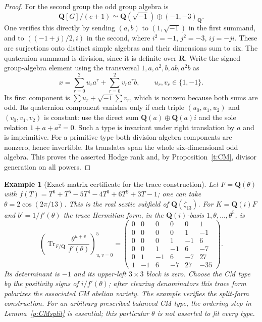 \documentclass[11pt,reqno]{article}
\theoremstyle{emphasizedplain}
\theoremstyle{emphasizeddefinition}
\newtheorem{example}[theorem]{Example}
\theoremstyle{emphasizeddefinition}
\DeclareMathOperator{\Tr}{Tr}
\newcommand{\Q}{\mathbf Q}
\newcommand{\R}{\mathbf R}
\begin{document}
\begin{proof}
For the second group the odd group algebra is
\[
 \Q[G]/(c+1)\simeq\Q(\sqrt{-1})\oplus(-1,-3)_\Q.
\]
One verifies this directly by sending $(a,b)$ to $(1,\sqrt{-1})$
in the first summand, and to $((-1+j)/2,i)$ in the second, where
$i^2=-1$, $j^2=-3$, $ij=-ji$. These are surjections onto distinct
simple algebras and their dimensions sum to six. The quaternion
summand is division, since it is definite over $\R$.
Write the signed group-algebra element using the transversal
$1,a,a^2,b,ab,a^2b$ as
\[
 x=\sum_{r=0}^2u_ra^r+\sum_{r=0}^2v_ra^rb,
 \qquad u_r,v_r\in\{1,-1\}.
\]
Its first component is $\sum u_r+\sqrt{-1}\sum v_r$, which is
nonzero because both sums are odd. Its quaternion component vanishes
only if each triple $(u_0,u_1,u_2)$ and $(v_0,v_1,v_2)$ is constant:
use the direct sum $\Q(a)\oplus\Q(a)i$ and the sole relation
$1+a+a^2=0$. Such a type is invariant under right translation by
$a$ and is imprimitive. For a primitive type both division-algebra
components are nonzero, hence invertible. Its translates span the
whole six-dimensional odd algebra. This proves the asserted Hodge
rank and, by Proposition~\ref{t:CM}, divisor generation on all powers.
\end{proof}

\begin{example}[Exact matrix certificate for the trace construction]
Let $F=\Q(\theta)$ with
$f(T)=T^6+T^5-5T^4-4T^3+6T^2+3T-1$; one can take
$\theta=2\cos(2\pi/13)$. This is the real sextic subfield of
$\Q(\zeta_{13})$. For $K=\Q(i)F$ and $b'=1/f'(\theta)$ the trace
Hermitian form, in the $\Q(i)$-basis $1,\theta,\ldots,\theta^5$, is
\[
 \left(\Tr_{F/\Q}\frac{\theta^{u+v}}{f'(\theta)}\right)_{u,v=0}^5
 =\begin{pmatrix}
 0&0&0&0&0&1\\
 0&0&0&0&1&-1\\
 0&0&0&1&-1&6\\
 0&0&1&-1&6&-7\\
 0&1&-1&6&-7&27\\
 1&-1&6&-7&27&-35
 \end{pmatrix}.
\]
Its determinant is $-1$ and its upper-left $3\times3$ block is zero.
Choose the CM type by the positivity signs of $i/f'(\theta)$; after
clearing denominators this trace form polarizes the associated CM
abelian variety. The example verifies the split-form construction.
For an arbitrary prescribed balanced CM type, the ordering step in
Lemma~\ref{p:CMsplit} is essential; this particular $\theta$ is not
asserted to fit every type.
\end{example}
\end{document}
